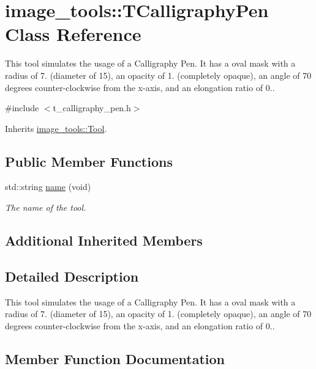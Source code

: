 \hypertarget{classimage__tools_1_1TCalligraphyPen}{}\section{image\+\_\+tools\+:\+:T\+Calligraphy\+Pen Class Reference}
\label{classimage__tools_1_1TCalligraphyPen}


This tool simulates the usage of a Calligraphy Pen. It has a oval mask with a radius of 7. (diameter of 15), an opacity of 1. (completely opaque), an angle of 70 degrees counter-\/clockwise from the x-\/axis, and an elongation ratio of 0..  




{\ttfamily \#include $<$t\+\_\+calligraphy\+\_\+pen.\+h$>$}



Inherits \hyperlink{classimage__tools_1_1Tool}{image\+\_\+tools\+::\+Tool}.

\subsection*{Public Member Functions}
\begin{DoxyCompactItemize}
\item 
std\+::string \hyperlink{classimage__tools_1_1TCalligraphyPen_adcc77e8eaf9fbd8d03eeba73f6f51f7b}{name} (void)
\begin{DoxyCompactList}\small\item\em The name of the tool. \end{DoxyCompactList}\end{DoxyCompactItemize}
\subsection*{Additional Inherited Members}


\subsection{Detailed Description}
This tool simulates the usage of a Calligraphy Pen. It has a oval mask with a radius of 7. (diameter of 15), an opacity of 1. (completely opaque), an angle of 70 degrees counter-\/clockwise from the x-\/axis, and an elongation ratio of 0.. 

\subsection{Member Function Documentation}
